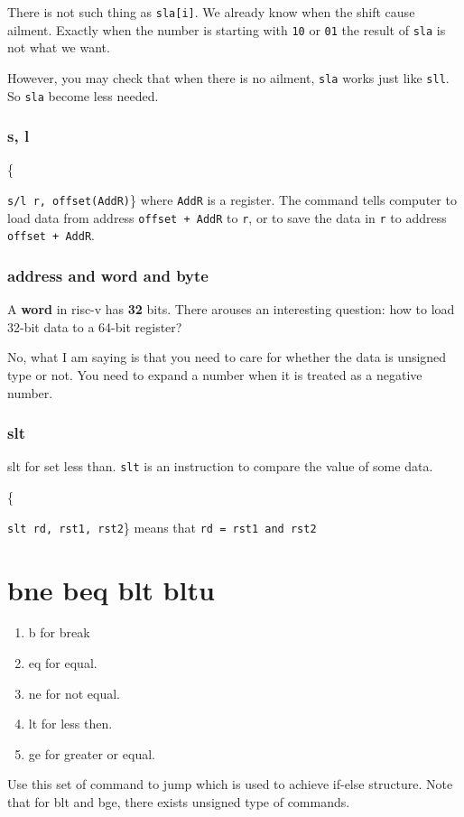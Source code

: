 \documentclass[11pt]{article}
\begin{document}
There is not such thing as \texttt{sla[i]}. We already know when the shift cause ailment. Exactly when the number is starting with \texttt{10} or \texttt{01} the result of \texttt{sla} is not what we want. 

However, you may check that when there is no ailment, \texttt{sla} works just like \texttt{sll}. So \texttt{sla} become less needed. 
\subsubsection{s, l}
\centerline\{\texttt{s/l r, offset(AddR)}\}
where \texttt{AddR} is a register. The command tells computer to load data from address \texttt{offset + AddR} to \texttt{r}, or to save the data in \texttt{r} to address \texttt{offset + AddR}.
\subsubsection{address and word and byte}
A \textbf{word} in risc-v has \textbf{32} bits. There arouses an interesting question: how to load 32-bit data to a 64-bit register? 

No, what I am saying is that you need to care for whether the data is unsigned type or not. You need to expand a number when it is treated as a negative number. 
\subsubsection{slt}
slt for set less than. \texttt{slt} is an instruction to compare the value of some data. 

\centerline\{\texttt{slt rd, rst1, rst2}\} 
means that \texttt{rd = rst1 and rst2}


\section{bne beq blt bltu}
\label{sec:org07ffc69}
\begin{enumerate}
\item b for break
\item eq for equal.
\item ne for not equal. 
\item lt for less then.
\item ge for greater or equal.
\end{enumerate}
Use this set of command to jump which is used to achieve if-else structure. Note that for blt and bge, there exists unsigned type of commands. 
\end{document}
